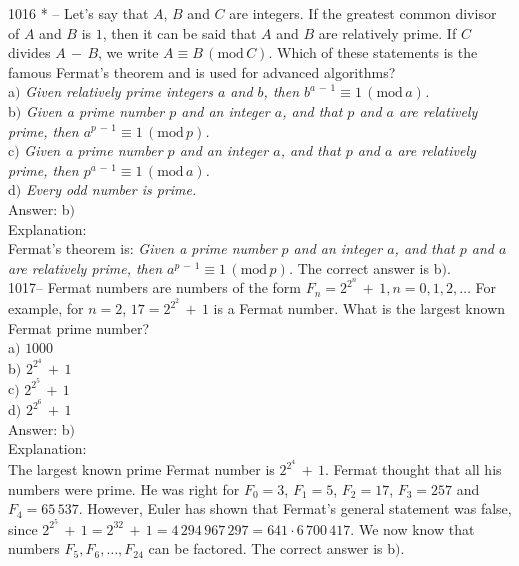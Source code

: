 \documentclass[letterpaper, 12pt]{article}
\begin{document}
1016 * -- Let's say that $A$, $B$ and $C$ are integers. If the greatest common divisor of $A$ and $B$ is $1$, then it can be said that $A$ and $B$ are relatively prime. If $C$ divides $A\,-\,B$, we write $A\equiv B\,(\mathrm{mod}\,C)$. Which of these statements is the famous Fermat's theorem and is used for advanced algorithms?\\

a$)$ {\sl Given relatively prime integers $a$ and $b$, then $b^{a\,-\,1}\equiv1\,(\mathrm{mod}\,a)$.} \\
b$)$ {\sl Given a prime number $p$ and an integer $a$, and that $p$ and $a$ are relatively prime, then
$a^{p\,-\,1}\equiv1\,(\mathrm{mod}\,p)$.} \\
c$)$ {\sl Given a prime number $p$ and an integer $a$, and that $p$ and $a$ are relatively prime, then
$p^{a\,-\,1}\equiv1\,(\mathrm{mod}\,a)$.} \\
d$)$ {\sl Every odd number is prime.}\\

Answer: b$)$\\

Explanation: \\
Fermat's theorem is:
{\sl Given a prime number $p$ and an integer
$a$, and that $p$ and $a$ are relatively prime, then
$a^{p\,-\,1}\equiv1\,(\mathrm{mod}\,p)$.}
The correct answer is b$)$.\\

1017-- Fermat numbers are numbers of the form $F_n=2^{2^n}\,+\,1,
n=0,1,2,\ldots$ For example, for $n=2$,
$17=2^{2^2}\,+\,1$ is a Fermat number. What is the largest known Fermat prime number?\\

a$)$ $1000$ \\
b$)$ $2^{2^4}\,+\,1$ \\
c$)$ $2^{2^5}\,+\,1$ \\
d$)$ $2^{2^6}\,+\,1$\\

Answer: b$)$\\

Explanation: \\
The largest known prime Fermat number is $2^{2^4}\,+\,1$. Fermat
thought that all his numbers were prime. He was right for $F_0=3$,
$F_1=5$, $F_2=17$, $F_3=257$ and $F_4=65\,537$. However, Euler has
shown that Fermat's general statement was false, since
$2^{2^5}\,+\,1=2^{32}\,+\,1=4\,294\,967\,297=641\cdot6\,700\,417$.
We now know that numbers $F_5,F_6,\ldots,F_{24}$ can be factored.
The correct answer is b$)$.\\
\end{document}
